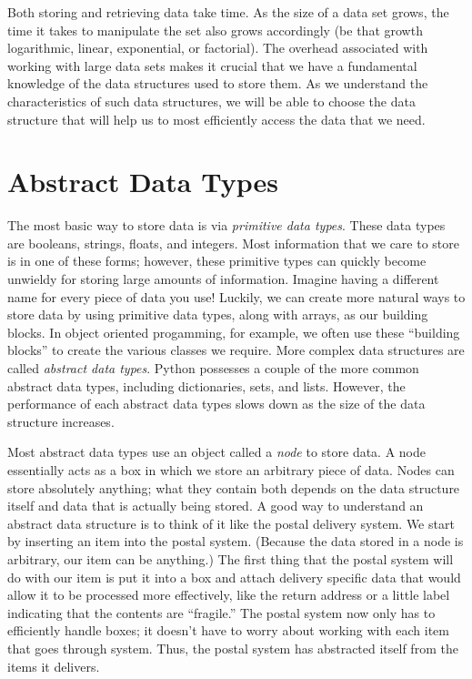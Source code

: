 \label{lab:Python_DataStructures}

Both storing and retrieving data take time. As the size of a data set grows, the time it takes to manipulate the set also grows accordingly (be that growth logarithmic, linear, exponential, or factorial).
The overhead associated with working with large data sets makes it crucial that we have a fundamental knowledge of the data structures used to store them.
As we understand the characteristics of such data structures, we will be able to choose the data structure that will help us to most efficiently access the data that we need.

\section*{Abstract Data Types}

The most basic way to store data is via \emph{primitive data types}.
These data types are booleans, strings, floats, and integers.
Most information that we care to store is in one of these forms; however, these primitive types can quickly become unwieldy for storing large amounts of information.
Imagine having a different name for every piece of data you use!
Luckily, we can create more natural ways to store data by using primitive data types, along with arrays, as our building blocks.
In object oriented progamming, for example, we often use these ``building blocks'' to create the various classes we require.
More complex data structures are called \emph{abstract data types}.
Python possesses a couple of the more common abstract data types, including dictionaries, sets, and lists.
However, the performance of each abstract data types slows down as the size of the data structure increases.

Most abstract data types use an object called a \emph{node} to store data.
A node essentially acts as a box in which we store an arbitrary piece of data.
Nodes can store absolutely anything; what they contain both depends on the data structure itself and data that is actually being stored.
A good way to understand an abstract data structure is to think of it like the postal delivery system.
We start by inserting an item into the postal system.
(Because the data stored in a node is arbitrary, our item can be anything.)
The first thing that the postal system will do with our item is put it into a box and attach delivery specific data that would allow it to be processed more effectively, like the return address or a little label indicating that the contents are ``fragile.''
The postal system now only has to efficiently handle boxes; it doesn't have to worry about working with each item that goes through system.
Thus, the postal system has abstracted itself from the items it delivers.

